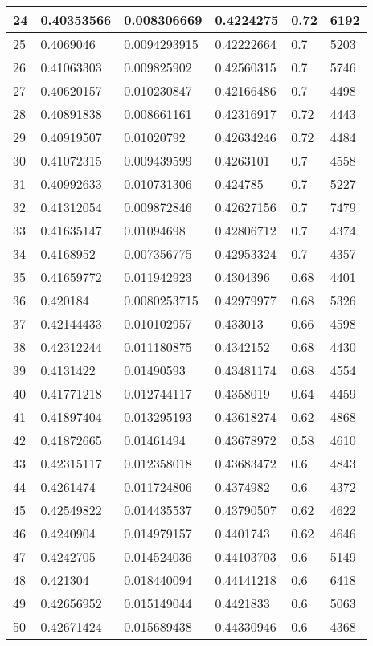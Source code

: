 \begin{longtable}{|l|l|l|l|l|l|}
24 & 0.40353566 & 0.008306669 & 0.4224275 & 0.72 & 6192 \\ \hline 
25 & 0.4069046 & 0.0094293915 & 0.42222664 & 0.7 & 5203 \\ \hline 
26 & 0.41063303 & 0.009825902 & 0.42560315 & 0.7 & 5746 \\ \hline 
27 & 0.40620157 & 0.010230847 & 0.42166486 & 0.7 & 4498 \\ \hline 
28 & 0.40891838 & 0.008661161 & 0.42316917 & 0.72 & 4443 \\ \hline 
29 & 0.40919507 & 0.01020792 & 0.42634246 & 0.72 & 4484 \\ \hline 
30 & 0.41072315 & 0.009439599 & 0.4263101 & 0.7 & 4558 \\ \hline 
31 & 0.40992633 & 0.010731306 & 0.424785 & 0.7 & 5227 \\ \hline 
32 & 0.41312054 & 0.009872846 & 0.42627156 & 0.7 & 7479 \\ \hline 
33 & 0.41635147 & 0.01094698 & 0.42806712 & 0.7 & 4374 \\ \hline 
34 & 0.4168952 & 0.007356775 & 0.42953324 & 0.7 & 4357 \\ \hline 
35 & 0.41659772 & 0.011942923 & 0.4304396 & 0.68 & 4401 \\ \hline 
36 & 0.420184 & 0.0080253715 & 0.42979977 & 0.68 & 5326 \\ \hline 
37 & 0.42144433 & 0.010102957 & 0.433013 & 0.66 & 4598 \\ \hline 
38 & 0.42312244 & 0.011180875 & 0.4342152 & 0.68 & 4430 \\ \hline 
39 & 0.4131422 & 0.01490593 & 0.43481174 & 0.68 & 4554 \\ \hline 
40 & 0.41771218 & 0.012744117 & 0.4358019 & 0.64 & 4459 \\ \hline 
41 & 0.41897404 & 0.013295193 & 0.43618274 & 0.62 & 4868 \\ \hline 
42 & 0.41872665 & 0.01461494 & 0.43678972 & 0.58 & 4610 \\ \hline 
43 & 0.42315117 & 0.012358018 & 0.43683472 & 0.6 & 4843 \\ \hline 
44 & 0.4261474 & 0.011724806 & 0.4374982 & 0.6 & 4372 \\ \hline 
45 & 0.42549822 & 0.014435537 & 0.43790507 & 0.62 & 4622 \\ \hline 
46 & 0.4240904 & 0.014979157 & 0.4401743 & 0.62 & 4646 \\ \hline 
47 & 0.4242705 & 0.014524036 & 0.44103703 & 0.6 & 5149 \\ \hline 
48 & 0.421304 & 0.018440094 & 0.44141218 & 0.6 & 6418 \\ \hline 
49 & 0.42656952 & 0.015149044 & 0.4421833 & 0.6 & 5063 \\ \hline 
50 & 0.42671424 & 0.015689438 & 0.44330946 & 0.6 & 4368 \\ \hline 
\end{longtable}